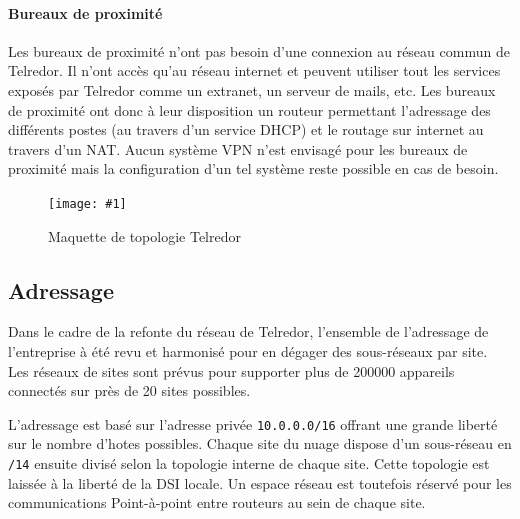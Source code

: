 \documentclass{article}
\newenvironment{figue}[1]{
	\par
	\bigskip
	\begin{figure}[h]
	\begin{center}
	  \texttt{[image: \#1]}
	\end{center}
}{
	\end{figure}
	\bigskip
}
\newcommand{\tlr}{Telredor\xspace}
\begin{document}
\paragraph{Bureaux de proximité} Les bureaux de proximité n'ont pas besoin d'une connexion au réseau commun de \tlr.
Il n'ont accès qu'au réseau internet et peuvent utiliser tout les services exposés par \tlr comme un extranet, un serveur de mails, etc.
Les bureaux de proximité ont donc à leur disposition un routeur permettant l'adressage des différents postes (au travers d'un service DHCP) et le routage sur internet au travers d'un NAT.
Aucun système VPN n'est envisagé pour les bureaux de proximité mais la configuration d'un tel système reste possible en cas de besoin.

\clearpage

\begin{figue}{img/telredor.pdf}
	\caption{Maquette de topologie \tlr}
\end{figue}

\subsection{Adressage}

Dans le cadre de la refonte du réseau de \tlr, l'ensemble de l'adressage de l'entreprise à été revu et harmonisé pour en dégager des sous-réseaux par site.
Les réseaux de sites sont prévus pour supporter plus de 200000 appareils connectés sur près de 20 sites possibles.

L'adressage est basé sur l'adresse privée \texttt{10.0.0.0/16} offrant une grande liberté sur le nombre d'hotes possibles.
Chaque site du nuage dispose d'un sous-réseau en \texttt{/14} ensuite divisé selon la topologie interne de chaque site.
Cette topologie est laissée à la liberté de la DSI locale.
Un espace réseau est toutefois réservé pour les communications Point-à-point entre routeurs au sein de chaque site.

\bigskip
\end{document}
